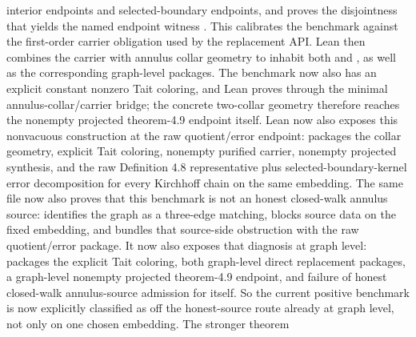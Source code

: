 \documentclass[11pt]{article}
\begin{document}
\begin{itemize}
interior endpoints and selected-boundary endpoints, and
proves the disjointness that yields the named endpoint witness
.  This calibrates the
benchmark against the first-order carrier obligation used by the replacement
API.  Lean then combines the carrier with annulus collar geometry to inhabit
both
 and
, as well as the
corresponding graph-level packages.  The benchmark now also has an explicit
constant nonzero Tait coloring, and Lean proves
 through the
minimal annulus-collar/carrier bridge; the concrete two-collar geometry
therefore reaches the nonempty projected theorem-4.9 endpoint itself.  Lean
now also exposes this nonvacuous construction at the raw quotient/error
endpoint:
packages the collar geometry, explicit Tait coloring, nonempty purified
carrier, nonempty projected synthesis, and the raw Definition 4.8
representative plus selected-boundary-kernel error decomposition for every
Kirchhoff chain on the same embedding.  The same file now also proves that this
benchmark is not an honest closed-walk annulus source:
 identifies the graph as a three-edge matching,
 blocks
source data on the fixed embedding, and
bundles that source-side obstruction with the raw quotient/error package.  It
now also exposes that diagnosis at graph level:
packages the explicit Tait coloring, both graph-level direct replacement
packages, a graph-level nonempty projected theorem-4.9 endpoint, and failure
of honest closed-walk annulus-source admission for 
itself.  So the current positive benchmark is now explicitly classified as off
the honest-source route already at graph level, not only on one chosen
embedding.  The stronger theorem

\end{itemize}
\end{document}
